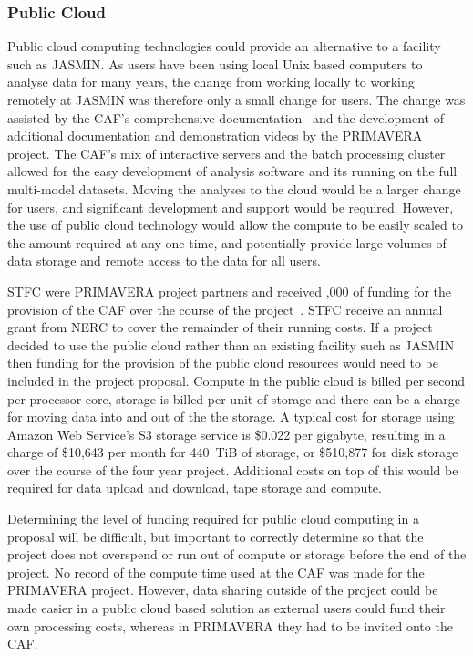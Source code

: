 \documentclass[gmd, manuscript]{copernicus}
\begin{document}
\subsubsection{Public Cloud}
Public cloud computing technologies could provide an alternative to a facility such as JASMIN. As users have been using local Unix based computers to analyse data for many years, the change from working locally to working remotely at JASMIN was therefore only a small change for users. The change was assisted by the CAF's comprehensive documentation~\citep{JASMINdocs} and the development of additional documentation and demonstration videos by the PRIMAVERA project. The CAF's mix of interactive servers and the batch processing cluster allowed for the easy development of analysis software and its running on the full multi-model datasets. Moving the analyses to the cloud would be a larger change for users, and significant development and support would be required. However, the use of public cloud technology would allow the compute to be easily scaled to the amount required at any one time, and potentially provide large volumes of data storage and remote access to the data for all users.

STFC were PRIMAVERA project partners and received ,000 of funding for the provision of the CAF over the course of the project~\citep{Bennett2020}. STFC receive an annual grant from NERC to cover the remainder of their running costs. If a project decided to use the public cloud rather than an existing facility such as JASMIN then funding for the provision of the public cloud resources would need to be included in the project proposal. Compute in the public cloud is billed per second per processor core, storage is billed per unit of storage and there can be a charge for moving data into and out of the the storage. A typical cost for storage using Amazon Web Service's S3 storage service is \$0.022 per gigabyte, resulting in a charge of \$10,643 per month for 440~TiB of storage, or \$510,877 for disk storage over the course of the four year project. Additional costs on top of this would be required for data upload and download, tape storage and compute.

Determining the level of funding required for public cloud computing in a proposal will be difficult, but important to correctly determine so that the project does not overspend or run out of compute or storage before the end of the project. No record of the compute time used at the CAF was made for the PRIMAVERA project. However, data sharing outside of the project could be made easier in a public cloud based solution as external users could fund their own processing costs, whereas in PRIMAVERA they had to be invited onto the CAF.
\end{document}

